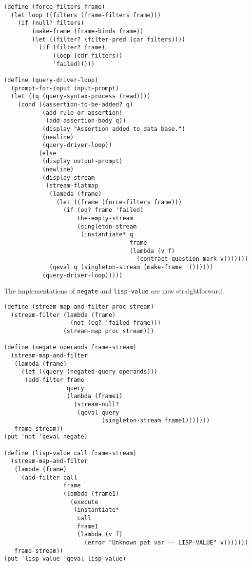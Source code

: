 \documentclass[a4paper,12pt]{article}
\begin{document}
\begin{lstlisting}
(define (force-filters frame)
  (let loop ((filters (frame-filters frame)))
    (if (null? filters)
        (make-frame (frame-binds frame))
        (let ((filter? (filter-pred (car filters))))
          (if (filter? frame)
              (loop (cdr filters))
              'failed)))))

(define (query-driver-loop)
  (prompt-for-input input-prompt)
  (let ((q (query-syntax-process (read))))
    (cond ((assertion-to-be-added? q)
           (add-rule-or-assertion!
            (add-assertion-body q))
           (display "Assertion added to data base.")
           (newline)
           (query-driver-loop))
          (else
           (display output-prompt)
           (newline)
           (display-stream
            (stream-flatmap
             (lambda (frame)
               (let ((frame (force-filters frame)))
                 (if (eq? frame 'failed)
                     the-empty-stream
                     (singleton-stream
                      (instantiate* q
                                    frame
                                    (lambda (v f)
                                      (contract-question-mark v)))))))
             (qeval q (singleton-stream (make-frame '())))))
           (query-driver-loop)))))
\end{lstlisting}

The implementations of \lstinline!negate! and \lstinline!lisp-value!
are now straightforward.

\begin{lstlisting}
(define (stream-map-and-filter proc stream)
  (stream-filter (lambda (frame)
                   (not (eq? 'failed frame)))
                 (stream-map proc stream)))

(define (negate operands frame-stream)
  (stream-map-and-filter
   (lambda (frame)
     (let ((query (negated-query operands)))
      (add-filter frame
                  query
                  (lambda (frame1)
                    (stream-null?
                     (qeval query
                            (singleton-stream frame1)))))))
   frame-stream))
(put 'not 'qeval negate)

(define (lisp-value call frame-stream)
  (stream-map-and-filter
   (lambda (frame)
     (add-filter call
                 frame
                 (lambda (frame1)
                   (execute
                    (instantiate*
                     call
                     frame1
                     (lambda (v f)
                       (error "Unknown pat var -- LISP-VALUE" v)))))))
   frame-stream))
(put 'lisp-value 'qeval lisp-value)
\end{lstlisting}
\end{document}
